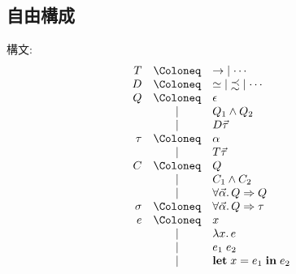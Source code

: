 \subsection{自由構成}

構文:
\begin{align*}
  \begin{array}{rcl}
    T
    &\Coloneq &{\to} \mid \cdots \\
    D
    &\Coloneq &{\simeq} \mid {\precsim} \mid \cdots \\
    Q
    &\Coloneq &\epsilon \\
    &\mid &Q_1 \land Q_2 \\
    &\mid &D \vec{\tau} \\
    \tau
    &\Coloneq &\alpha \\
    &\mid &T \vec{\tau} \\
    C
    &\Coloneq &Q \\
    &\mid &C_1 \land C_2 \\
    &\mid &\forall \vec{\alpha}\ldotp Q \Rightarrow Q \\
    \sigma
    &\Coloneq &\forall \vec{\alpha}\ldotp Q \Rightarrow \tau \\
    e
    &\Coloneq &x \\
    &\mid &\lambda x\ldotp e \\
    &\mid &e_1\; e_2 \\
    &\mid &\mathbf{let}\; x = e_1\; \mathbf{in}\; e_2
  \end{array}
\end{align*}

